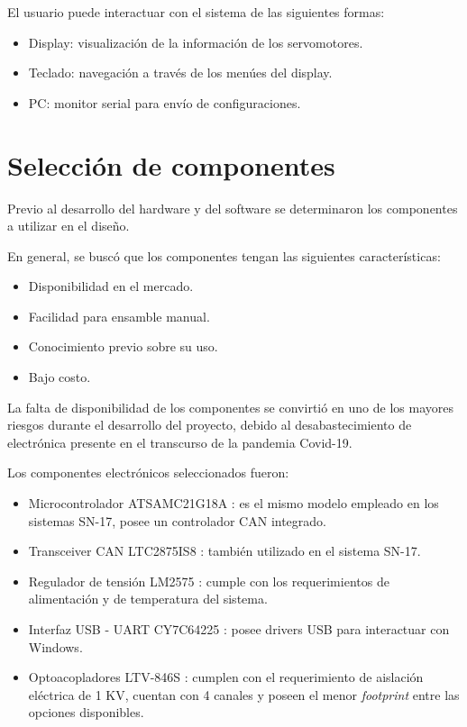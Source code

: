 El usuario puede interactuar con el sistema de las siguientes formas:
\begin{itemize}
	\item Display: visualización de la información de los servomotores.
	\item Teclado: navegación a través de los menúes del display.
	\item PC: monitor serial para envío de configuraciones.
\end{itemize}

\newpage

\section{Selección de componentes}
\label{seccion_seleccion_componentes}

Previo al desarrollo del hardware y del software se determinaron los componentes a utilizar en el diseño. 

En general, se buscó que los componentes tengan las siguientes características:
\begin{itemize}
	\item Disponibilidad en el mercado.
	\item Facilidad para ensamble manual.
	\item Conocimiento previo sobre su uso.
	\item Bajo costo.
\end{itemize}

La falta de disponibilidad de los componentes se convirtió en uno de los mayores riesgos durante el desarrollo del proyecto, debido al desabastecimiento de electrónica presente en el transcurso de la pandemia Covid-19.

Los componentes electrónicos seleccionados fueron:

\begin{itemize}
	\item Microcontrolador ATSAMC21G18A \citep{web_ATSAMC21G18A}: es el mismo modelo empleado en los sistemas SN-17, posee un controlador CAN integrado.
	\item Transceiver CAN LTC2875IS8 \citep{web_transciever_CAN}: también utilizado en el sistema SN-17.
	\item Regulador de tensión LM2575 \citep{web_LM2575}: cumple con los requerimientos de alimentación y de temperatura del sistema.
	\item Interfaz USB - UART CY7C64225 \citep{web_interfaz_USB_UART}: posee drivers USB para interactuar con Windows.
	\item Optoacopladores LTV-846S \citep{web_optoacopladores_LTV}: cumplen con el requerimiento de aislación eléctrica de 1 KV, cuentan con 4 canales y poseen el menor \textit{footprint} entre las opciones disponibles.
\end{itemize}

